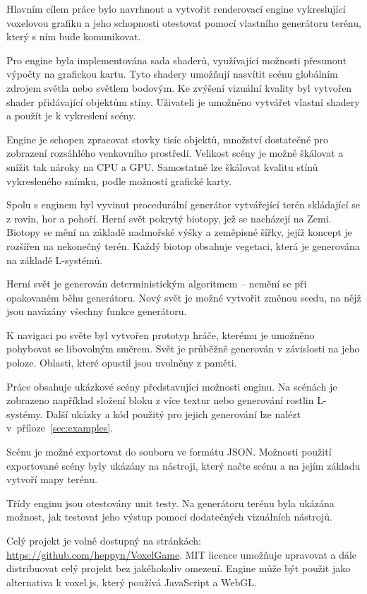 \documentclass[thesis=M,czech]{FITthesis}[2019/12/23]
\begin{document}
\begin{conclusion}
Hlavním cílem práce bylo navrhnout a vytvořit renderovací engine vykreslující voxelovou grafiku a jeho schopnosti otestovat pomocí vlastního generátoru terénu, který s ním bude komunikovat.

Pro engine byla implementována sada shaderů, využívající možnosti pře\-su\-nout výpočty na grafickou kartu. Tyto shadery umožňují nasvítit scénu globálním zdrojem světla nebo světlem bodovým. Ke zvýšení vizuální kvality byl vytvořen shader přidávající objektům stíny. Uživateli je umožněno vytvářet vlastní shadery a použít je k vykreslení scény.

Engine je schopen zpracovat stovky tisíc objektů, množství dostatečné pro zobrazení rozsáhlého venkovního prostředí. Velikost scény je možné škálovat a snížit tak nároky na CPU a GPU. Samostatně lze škálovat kvalitu stínů vykresleného snímku, podle možností grafické karty.

Spolu s enginem byl vyvinut procedurální generátor vytvářející terén sklá\-da\-jí\-cí se z rovin, hor a pohoří. Herní svět pokrytý biotopy, jež se nacházejí na Zemi. Biotopy se mění na základě nadmořské výšky a zeměpisné šířky, jejíž koncept je rozšířen na nekonečný terén. Každý biotop obsahuje vegetaci, která je generována na základě L-systémů.

Herní svět je generován deterministickým algoritmem -- nemění se při opakovaném běhu generátoru. Nový svět je možné vytvořit změnou seedu, na nějž jsou navázány všechny funkce generátoru.

K navigaci po světe byl vytvořen prototyp hráče, kterému je umožněno pohybovat se libovolným směrem. Svět je průběžně generován v závislosti na jeho poloze. Oblasti, které opustil jsou uvolněny z paměti. 

Práce obsahuje ukázkové scény představující možnosti enginu. Na scénách je zobrazeno například složení bloku z více textur nebo generování rostlin L-systémy. Další ukázky a kód použitý pro jejich generování lze nalézt v~příloze~\ref{sec:examples}.

Scénu je možné exportovat do souboru ve formátu JSON. Možnosti použití exportované scény byly ukázány na nástroji, který načte scénu a na jejím základu vytvoří mapy terénu.

Třídy enginu jsou otestovány unit testy. Na generátoru terénu byla uká\-zá\-na možnost, jak testovat jeho výstup pomocí dodatečných vizuálních nástrojů.

Celý projekt je volně dostupný na stránkách: \url{https://github.com/heppyn/VoxelGame}. MIT licence umožňuje upravovat a dále distribuovat celý projekt bez jakéhokoliv omezení. Engine může být použit jako alternativa k voxel.js, který používá JavaScript a WebGL.


\end{conclusion}
\end{document}
